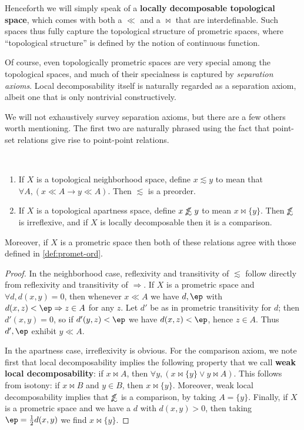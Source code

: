 \documentclass{article}
\def\oapt{\mathrel{\!\not\,\not\lesssim}}
\def\leapx{\lesssim}
\let\implies\Rightarrow
\def\singleton#1{\{#1\}}
\begin{document}
Henceforth we will simply speak of a \textbf{locally decomposable topological space}, which comes with both a $\ll$ and a $\bowtie$ that are interdefinable.
Such spaces thus fully capture the topological structure of prometric spaces, where ``topological structure'' is defined by the notion of continuous function.

Of course, even topologically prometric spaces are very special among the topological spaces, and much of their specialness is captured by \emph{separation axioms}.
Local decomposability itself is naturally regarded as a separation axiom, albeit one that is only nontrivial constructively.

We will not exhaustively survey separation axioms, but there are a few others worth mentioning.
The first two are naturally phrased using the fact that point-set relations give rise to point-point relations.

\begin{thm}\label{thm:top-ord}\ 
  \begin{enumerate}
  \item If $X$ is a topological neighborhood space, define $x\leapx y$ to mean that $\forall A, (x\ll A \to y\ll A)$.
    Then $\leapx$ is a preorder.
  \item If $X$ is a topological apartness space, define $x\oapt y$ to mean $x \bowtie \singleton{y}$.
    Then $\oapt$ is irreflexive, and if $X$ is locally decomposable then it is a comparison.
  \end{enumerate}
  Moreover, if $X$ is a prometric space then both of these relations agree with those defined in \cref{def:promet-ord}.
\end{thm}
\begin{proof}
  In the neighborhood case, reflexivity and transitivity of $\leapx$ follow directly from reflexivity and transitivity of $\implies$.
  If $X$ is a prometric space and $\forall d, d(x,y)=0$, then whenever $x\ll A$ we have $d,\ep$ with $d(x,z)<\ep \implies z\in A$ for any $z$.
  Let $d'$ be as in prometric transitivity for $d$; then $d'(x,y)=0$, so if $d'(y,z)<\ep$ we have $d(x,z)<\ep$, hence $z\in A$.
  Thus $d',\ep$ exhibit $y\ll A$.

  In the apartness case, irreflexivity is obvious.
  For the comparison axiom, we note first that local decomposability implies the following property that we call \textbf{weak local decomposability}: if $x\bowtie A$, then $\forall y, (x\bowtie \singleton{y} \lor y\bowtie A)$.
  This follows from isotony: if $x\bowtie B$ and $y\in B$, then $x\bowtie \singleton{y}$.
  Moreover, weak local decomposability implies that $\oapt$ is a comparison, by taking $A = \singleton{y}$.
  Finally, if $X$ is a prometric space and we have a $d$ with $d(x,y)>0$, then taking $\ep=\frac12 d(x,y)$ we find $x\bowtie \singleton{y}$.
\end{proof}
\end{document}
